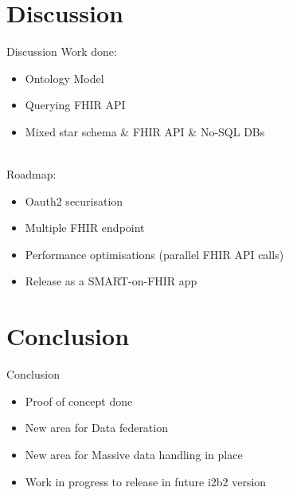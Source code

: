 \documentclass[10pt]{beamer}
\begin{document}
\section{Discussion}
\begin{frame}{Discussion}{}
Work done:
\begin{itemize}
\item Ontology Model
\item Querying FHIR API
\item Mixed star schema \& FHIR API \& No-SQL DBs
\end{itemize}
~
	\\
	Roadmap:
\begin{itemize}
\item Oauth2 securisation
\item Multiple FHIR endpoint 
\item Performance optimisations (parallel FHIR API calls)
\item Release as a SMART-on-FHIR app 
\end{itemize}
\end{frame}

\section{Conclusion}
\begin{frame}{Conclusion}{}
\begin{itemize}
\item Proof of concept done
\item New area for Data federation
\item New area for Massive data handling in place
\item Work in progress to release in future i2b2 version
\end{itemize}
\end{frame}

{\1
\begin{frame}
\end{frame}}
\end{document}
